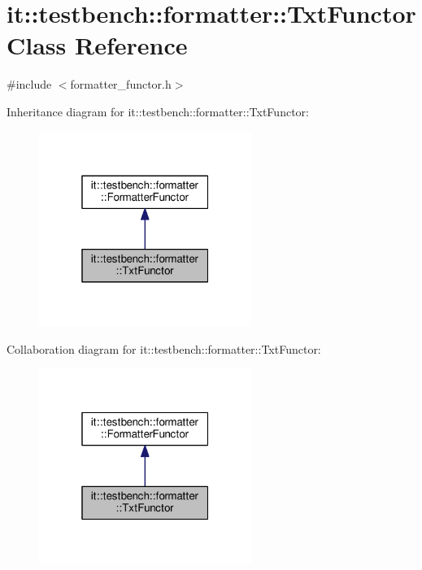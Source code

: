 \hypertarget{classit_1_1testbench_1_1formatter_1_1TxtFunctor}{\section{it\-:\-:testbench\-:\-:formatter\-:\-:Txt\-Functor Class Reference}
\label{d3/d73/classit_1_1testbench_1_1formatter_1_1TxtFunctor}
}


{\ttfamily \#include $<$formatter\-\_\-functor.\-h$>$}



Inheritance diagram for it\-:\-:testbench\-:\-:formatter\-:\-:Txt\-Functor\-:
\nopagebreak
\begin{figure}[H]
\begin{center}
\leavevmode
\includegraphics[width=196pt]{da/d94/classit_1_1testbench_1_1formatter_1_1TxtFunctor__inherit__graph}
\end{center}
\end{figure}


Collaboration diagram for it\-:\-:testbench\-:\-:formatter\-:\-:Txt\-Functor\-:
\nopagebreak
\begin{figure}[H]
\begin{center}
\leavevmode
\includegraphics[width=196pt]{d5/da2/classit_1_1testbench_1_1formatter_1_1TxtFunctor__coll__graph}
\end{center}
\end{figure}
